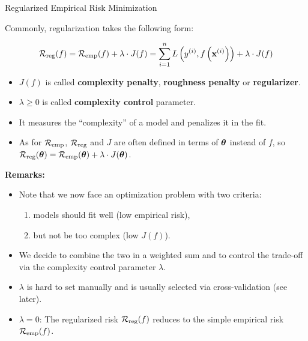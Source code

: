 \documentclass[11pt,compress,t,notes=noshow, xcolor=table]{beamer}
\begin{document}
\begin{vbframe}{Regularized Empirical Risk Minimization}

  Commonly, regularization takes the following form:
  
  $$
  \mathcal{R}_{\text{reg}}(f) = \mathcal{R}_{\text{emp}}(f) + \lambda \cdot J(f) = \sum\limits_{i=1}^n L\left(y^{(i)}, f\left(\mathbf{x}^{(i)}\right)\right) + \lambda \cdot J(f)
  $$
\begin{itemize}

  \item $J(f)$ is called \textbf{complexity penalty}, \textbf{roughness penalty} or \textbf{regularizer}.
  \item $\lambda \geq 0$ is called \textbf{complexity control} parameter. 
  \item It measures the \enquote{complexity} of a model and penalizes it in the fit.
  \item As for $\mathcal{R}_{\text{emp}}$, $\mathcal{R}_{\text{reg}}$ and $J$ are often defined in terms of $\bm{\theta}$ instead of $f$, so $\mathcal{R}_{\text{reg}}(\bm{\theta}) = \mathcal{R}_{\text{emp}}(\bm{\theta}) + \lambda \cdot J(\bm{\theta})$. 
\end{itemize}

\framebreak

\textbf{Remarks:}

\begin{itemize}
  \item Note that we now face an optimization problem with two criteria: 
    \begin{enumerate}
      \item models should fit well (low empirical risk),
      \item but not be too complex (low $J(f)$). 
    \end{enumerate}
  \item We decide to combine the two in a weighted sum and to control
  the trade-off via the complexity control parameter $\lambda$.
  \item $\lambda$ is hard to set manually and is usually selected via cross-validation (see later).
  \item $\lambda = 0$: The regularized risk $\mathcal{R}_{\text{reg}}(f)$ reduces to the simple empirical risk $\mathcal{R}_{\text{emp}}(f)$.


\end{itemize}
\end{vbframe}
\end{document}
